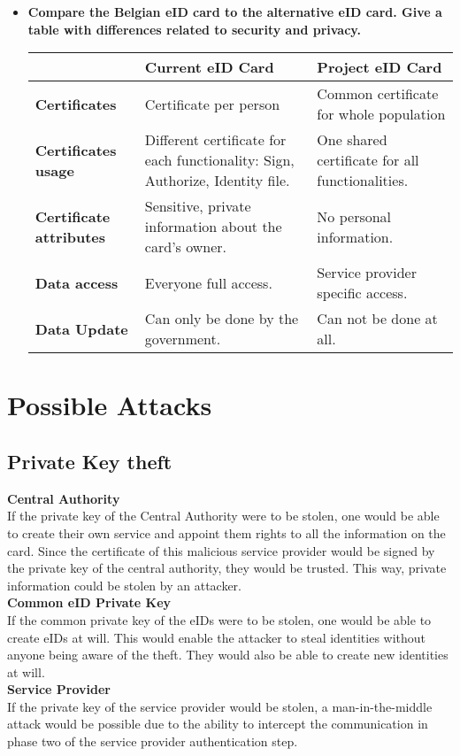 \documentclass[12pt]{report}
\begin{document}
\begin{itemize}
\item \textbf{Compare the Belgian eID card to the alternative eID card. Give a table with differences related to security and privacy.}\\

\begin{tabularx}{\textwidth}{|X|X|X|}
\hline
& \textbf{Current eID Card} & \textbf{Project eID Card}\\
\hline
\textbf{Certificates} & Certificate per person & Common certificate for whole population \\
\hline
\textbf{Certificates usage} & Different certificate for each functionality: Sign, Authorize, Identity file. & One shared certificate for all functionalities.\\
\hline
\textbf{Certificate attributes} & Sensitive, private information about the card's owner. & No personal information.\\
\hline
\textbf{Data access} & Everyone full access. & Service provider specific access.
\\
\hline
\textbf{Data Update} & Can only be done by the government. & Can not be done at all.\\
\hline
\end{tabularx}

\end{itemize}

\section{Possible Attacks}
\subsection{Private Key theft}
\textbf{Central Authority}\\
If the private key of the Central Authority were to be stolen, one would be able to create their own service and appoint them rights to all the information on the card. Since the certificate of this malicious service provider would be signed by the private key of the central authority, they would be trusted.
This way, private information could be stolen by an attacker.\\
\textbf{Common eID Private Key}\\
If the common private key of the eIDs were to be stolen, one would be able to create eIDs at will. This would enable the attacker to steal identities without anyone being aware of the theft. They would also be able to create new identities at will.\\
\textbf{Service Provider}\\
If the private key of the service provider would be stolen, a man-in-the-middle attack would be possible due to the ability to intercept the communication in phase two of the service provider authentication step.
\end{document}

